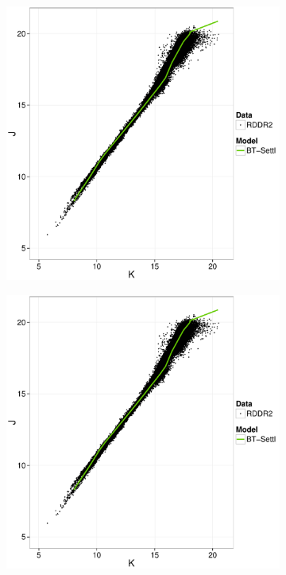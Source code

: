 \begin{figure}[ht!]
    \centering
    \begin{subfigure}[t]{0.45\textwidth}
       \includegraphics[page=1,width=\textwidth]{background/Figures/BHM/BHM_vs_BT-Settl.pdf}
        \caption{}
    \end{subfigure}
    \begin{subfigure}[t]{0.45\textwidth}
     \includegraphics[page=2,width=\textwidth]{background/Figures/BHM/BHM_vs_BT-Settl.pdf}

\end{subfigure}
\end{figure}
